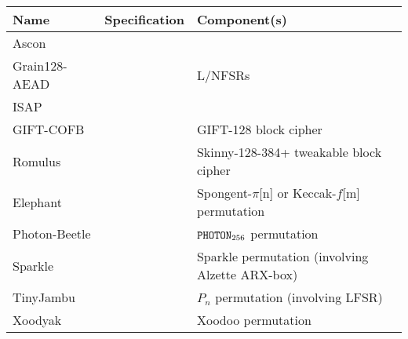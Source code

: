 \documentclass{beamer}
\begin{document}

\begin{frame}
\titlepage
\end{frame}

\begin{frame}

\begin{center}
\begin{scriptsize}
\begin{tabular}{|lc|l|}
\hline
Name          & Specification           & Component(s)                                                                     \\
\hline
Ascon         & \cite{NIST:LW:ascon}    &                                                                                  \\
Grain128-AEAD & \cite{NIST:LW:grain}    & L/NFSRs                                                                          \\
ISAP          & \cite{NIST:LW:isap}     &                                                                                  \\
\hline
GIFT-COFB     & \cite{NIST:LW:gift}     & GIFT-128                  block cipher                                           \\
Romulus       & \cite{NIST:LW:romulus}  & Skinny-128-384+ tweakable block cipher                                           \\
\hline
Elephant      & \cite{NIST:LW:elephant} & Spongent-$\pi$[n] or Keccak-$f$[m] permutation                                   \\
Photon-Beetle & \cite{NIST:LW:photon}   & ${\tt PHOTON}_{256}$               permutation                                   \\
Sparkle       & \cite{NIST:LW:sparkle}  & {\sc Sparkle}                      permutation (involving {\sf Alzette} ARX-box) \\
TinyJambu     & \cite{NIST:LW:jambu}    & $P_n$                              permutation (involving LFSR)                  \\
Xoodyak       & \cite{NIST:LW:xoodyak}  & {\sc Xoodoo}                       permutation                                   \\
\hline
\end{tabular}
\end{scriptsize}
\end{center}

\end{frame}



\end{document}
